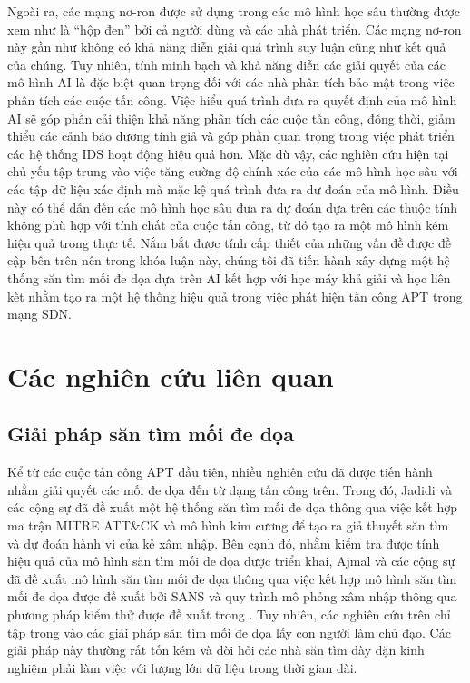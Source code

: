 Ngoài ra, các mạng nơ-ron được sử dụng trong các mô hình học sâu thường được xem như là ``hộp đen” bởi cả người dùng và các nhà phát triển. Các mạng nơ-ron này gần như không có khả năng diễn giải quá trình suy luận cũng như kết quả của chúng. Tuy nhiên, tính minh bạch và khả năng diễn các giải quyết của các mô hình AI là đặc biệt quan trọng đối với các nhà phân tích bảo mật trong việc phân tích các cuộc tấn công. Việc hiểu quá trình đưa ra quyết định của mô hình AI sẽ góp phần cải thiện khả năng phân tích các cuộc tấn công, đồng thời, giảm thiểu các cảnh báo dương tính giả và góp phần quan trọng trong việc phát triển các hệ thống IDS hoạt động hiệu quả hơn. Mặc dù vậy, các nghiên cứu hiện tại chủ yếu tập trung vào việc tăng cường độ chính xác của các mô hình học sâu với các tập dữ liệu xác định mà mặc kệ quá trình đưa ra dư đoán của mô hình. Điều này có thể dẫn đến các mô hình học sâu đưa ra dự đoán dựa trên các thuộc tính không phù hợp với tính chất của cuộc tấn công, từ đó tạo ra một mô hình kém hiệu quả trong thực tế.%
\bigbreak\noindent
Nắm bắt được tính cấp thiết của những vấn đề được đề cập bên trên nên trong khóa luận này, chúng tôi đã tiến hành xây dựng một hệ thống săn tìm mối đe dọa dựa trên AI kết hợp với học máy khả giải và học liên kết nhằm tạo ra một hệ thống hiệu quả trong việc phát hiện tấn công APT trong mạng SDN.


\section{Các nghiên cứu liên quan}

\subsection{{Giải pháp săn tìm mối đe dọa}}

Kể từ các cuộc tấn công APT đầu tiên, nhiều nghiên cứu đã được tiến hành nhằm giải quyết các mối đe dọa đến từ dạng tấn công trên. Trong đó, Jadidi và các cộng sự \cite{jadidi2021threat} đã đề xuất một hệ thống săn tìm mối đe dọa thông qua việc kết hợp ma trận MITRE ATT\&CK \cite{mitre2022} và mô hình kim cương \cite{caltagirone2013diamond} để tạo ra giả thuyết săn tìm và dự đoán hành vi của kẻ xâm nhập. Bên cạnh đó, nhằm kiểm tra được tính hiệu quả của mô hình săn tìm mối đe dọa được triển khai, Ajmal và các cộng sự \cite{ajmal2021offensive} đã đề xuất mô hình săn tìm mối đe dọa thông qua việc kết hợp mô hình săn tìm mối đe dọa được đề xuất bởi SANS \cite{gunter2018practical} và quy trình mô phỏng xâm nhập thông qua phương pháp kiểm thử được đề xuất trong \cite{archibald2019refining}. Tuy nhiên, các nghiên cứu trên chỉ tập trong vào các giải pháp săn tìm mối đe dọa lấy con người làm chủ đạo. Các giải pháp này thường rất tốn kém và đòi hỏi các nhà săn tìm dày dặn kinh nghiệm phải làm việc với lượng lớn dữ liệu trong thời gian dài.

